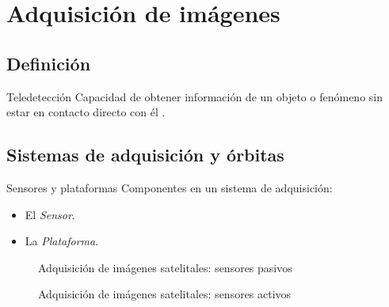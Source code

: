 \section{Adquisición de imágenes}

\subsection{Definición}
\begin{frame}{}
\begin{block}{Teledetección}
 Capacidad de obtener información de un objeto o fenómeno sin estar en contacto directo con él .
\end{block}

\end{frame}

\subsection{Sistemas de adquisición y órbitas}

\begin{frame}{}

\begin{block}{Sensores y plataformas}
  Componentes en un sistema de adquisición:
  \begin{itemize}
    \item El \emph{Sensor}.
    \item La \emph{Plataforma}.
  \end{itemize}
\end{block}

\end{frame}



\begin{frame}{}
  \begin{figure}
    \centering
    \caption{Adquisición de imágenes satelitales: sensores pasivos}
    \label{}
  \end{figure}
\end{frame}

\begin{frame}{}
  \begin{figure}
    \centering
    \caption{Adquisición de imágenes satelitales: sensores activos}
    \label{}
  \end{figure}
\end{frame}

